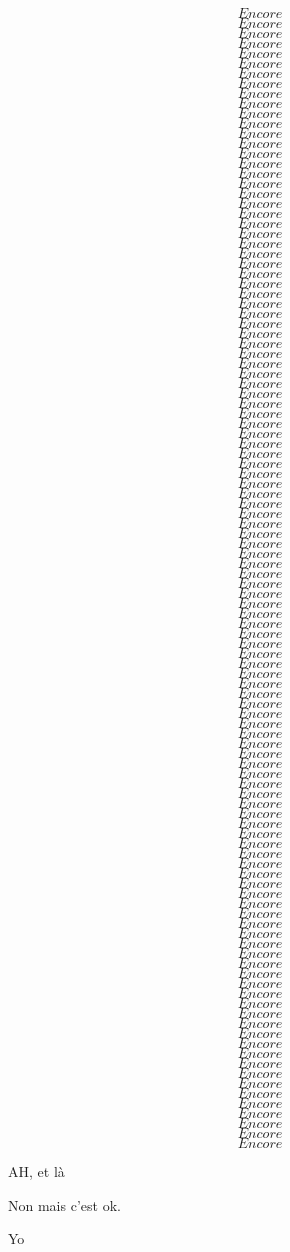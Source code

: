\documentclass[a4paper, 10pt]{book}
\begin{document}
\[
	Encore
\]
\[
	Encore
\]
\[
	Encore
\]
\[
	Encore
\]
\[
	Encore
\]
\[
	Encore
\]
\[
	Encore
\]
\[
	Encore
\]
\[
	Encore
\]
\[
	Encore
\]
\[
	Encore
\]
\[
	Encore
\]
\[
	Encore
\]
\[
	Encore
\]
\[
	Encore
\]
\[
	Encore
\]
\[
	Encore
\]
\[
	Encore
\]
\[
	Encore
\]
\[
	Encore
\]
\[
	Encore
\]
\[
	Encore
\]
\[
	Encore
\]
\[
	Encore
\]
\[
	Encore
\]
\[
	Encore
\]
\[
	Encore
\]
\[
	Encore
\]
\[
	Encore
\]
\[
	Encore
\]
\[
	Encore
\]
\[
	Encore
\]
\[
	Encore
\]
\[
	Encore
\]
\[
	Encore
\]
\[
	Encore
\]
\[
	Encore
\]
\[
	Encore
\]
\[
	Encore
\]
\[
	Encore
\]
\[
	Encore
\]
\[
	Encore
\]
\[
	Encore
\]
\[
	Encore
\]
\[
	Encore
\]
\[
	Encore
\]
\[
	Encore
\]
\[
	Encore
\]
\[
	Encore
\]
\[
	Encore
\]
\[
	Encore
\]
\[
	Encore
\]
\[
	Encore
\]
\[
	Encore
\]
\[
	Encore
\]
\[
	Encore
\]
\[
	Encore
\]
\[
	Encore
\]
\[
	Encore
\]
\[
	Encore
\]
\[
	Encore
\]
\[
	Encore
\]
\[
	Encore
\]
\[
	Encore
\]
\[
	Encore
\]
\[
	Encore
\]
\[
	Encore
\]
\[
	Encore
\]
\[
	Encore
\]
\[
	Encore
\]
\[
	Encore
\]
\[
	Encore
\]
\[
	Encore
\]
\[
	Encore
\]
\[
	Encore
\]
\[
	Encore
\]
\[
	Encore
\]
\[
	Encore
\]
\[
	Encore
\]
\[
	Encore
\]
\[
	Encore
\]
\[
	Encore
\]
\[
	Encore
\]
\[
	Encore
\]
\[
	Encore
\]
\[
	Encore
\]
\[
	Encore
\]
\[
	Encore
\]
\[
	Encore
\]
\[
	Encore
\]
\[
	Encore
\]
\[
	Encore
\]
\[
	Encore
\]
\[
	Encore
\]
\[
	Encore
\]
\[
	Encore
\]
\[
	Encore
\]
\[
	Encore
\]
\[
	Encore
\]
\[
	Encore
\]
\[
	Encore
\]
\[
	Encore
\]
\[
	Encore
\]
\[
	Encore
\]
\[
	Encore
\]
\[
	Encore
\]
\[
	Encore
\]
\[
	Encore
\]
\[
	Encore
\]
\[
	Encore
\]
\[
	Encore
\]
\[
	Encore
\]
\[
	Encore
\]
\[
	Encore
\]

AH, et là

Non mais c'est ok.

\begin{Test}
	Yo
\end{Test}
\end{document}
